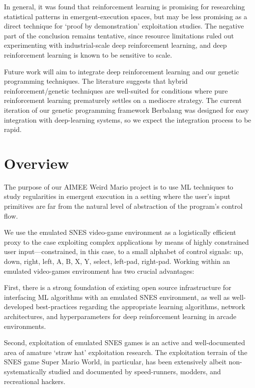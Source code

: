 \documentclass[]{article}
\begin{document}
In general, it was found that reinforcement learning is promising for
researching statistical patterns in emergent-execution spaces, but may
be less promising as a direct technique for `proof by demonstration'
exploitation studies. The negative part of the conclusion remains
tentative, since resource limitations ruled out experimenting with
industrial-scale deep reinforcement learning, and deep reinforcement
learning is known to be sensitive to scale.

Future work will aim to integrate deep reinforcement learning and our
genetic programming techniques. The literature suggests that hybrid
reinforcement/genetic techniques are well-suited for conditions where
pure reinforcement learning prematurely settles on a mediocre strategy.
The current iteration of our genetic programming framework Berbalang was
designed for easy integration with deep-learning systems, so we expect
the integration process to be rapid.

\hypertarget{overview}{%
\section{Overview}\label{overview}}

The purpose of our AIMEE Weird Mario project is to use ML techniques to
study regularities in emergent execution in a setting where the user's
input primitives are far from the natural level of abstraction of the
program's control flow.

We use the emulated SNES video-game environment as a logistically
efficient proxy to the case exploiting complex applications by means of
highly constrained user input---constrained, in this case, to a small
alphabet of control signals: up, down, right, left, A, B, X, Y, select,
left-pad, right-pad. Working within an emulated video-games environment
has two crucial advantages:

First, there is a strong foundation of existing open source
infrastructure for interfacing ML algorithms with an emulated SNES
environment, as well as well-developed best-practices regarding the
appropriate learning algorithms, network architectures, and
hyperparameters for deep reinforcement learning in arcade environments.

Second, exploitation of emulated SNES games is an active and
well-documented area of amature `straw hat' exploitation research. The
exploitation terrain of the SNES game Super Mario World, in particular,
has been extensively albeit non-systematically studied and documented by
speed-runners, modders, and recreational hackers.
\end{document}
